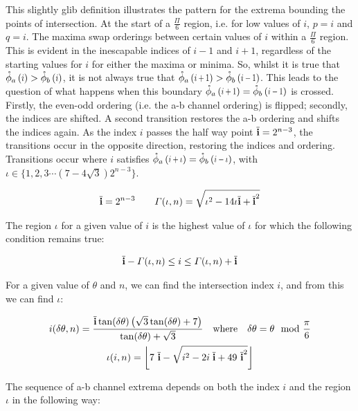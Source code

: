 This slightly glib definition illustrates the pattern for the extrema bounding the points of intersection. At the start of a $\frac{\Pi}{6}$ region, i.e. for low values of $i$, $p=i$ and $q=i$. The maxima swap orderings between certain values of $i$ within a $\frac{\Pi}{6}$ region. This is evident in the inescapable indices of $i-1$ and $i+1$, regardless of the starting values for $i$ for either the maxima or minima. So, whilst it is true that $\extremaTheta{a} {i} > \extremaTheta{b} {i}$, it is not always true that $\extremaTheta{a} {i+1} > \extremaTheta{b} {i-1}$. This leads to the question of what happens when this boundary $\extremaTheta{a} {i+1} = \extremaTheta{b} {i-1}$ is crossed. Firstly, the even-odd ordering (i.e. the a-b channel ordering) is flipped; secondly, the indices are shifted. A second transition restores the a-b ordering and shifts the indices again. As the index $i$ passes the half way point $\overline{\mathbf{i}} = 2^{n-3}$, the transitions occur in the opposite direction, restoring the indices and ordering. Transitions occur where $i$ satisfies $\extremaTheta{a} {i+\iota} = \extremaTheta{b} {i-\iota}$, with $\iota \in \{ 1,2,3 \cdots \left(7-4 \sqrt{3}\right) 2^{n-3}\} $. 

\begin{gather*}
\overline{\mathbf{i}} = 2^{n-3} \qquad
\varGamma(\iota, n) = \sqrt{\iota ^2 - 14 \iota \overline{\mathbf{i}} + \overline{\mathbf{i}}^{2} } 
\end{gather*}

The region $\iota$ for a given value of $i$ is the highest value of $\iota$ for which the following condition remains true:

\begin{gather*}
\overline{\mathbf{i}} -\varGamma(\iota, n) \leq i \leq \varGamma(\iota, n) + \overline{\mathbf{i}} 
\end{gather*}

For a given value of $\theta$ and $n$, we can find the intersection index $i$, and from this we can find $\iota$:

\begin{gather}\label{eq:indexFromTheta}
i(\delta\theta, n) = \frac{\overline{\mathbf{i}} \tan (\delta \theta ) \left(\sqrt{3} \tan (\delta \theta )+7\right)}{\tan (\delta \theta )+\sqrt{3}} 
\quad \text{where} \quad \delta\theta = \theta \mod{\frac{\pi}{6} }\\
 \iota(i,n)  = \left\lfloor 7\ \overline{\mathbf{i}}-\sqrt{i^2 - 2 i \; \overline{\mathbf{i}} + 49\ \overline{\mathbf{i}}^2 }\right\rfloor 
\end{gather}

The sequence of a-b channel extrema depends on both the index $i$ and the region $\iota$ in the following way:

